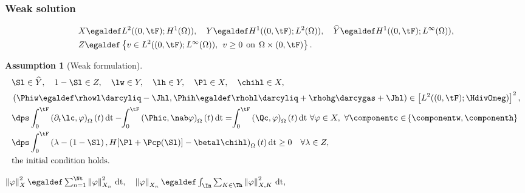 \documentclass[10 pt]{beamer}
\newtheorem{assumption}[theorem]{Assumption}
\begin{document}
\begin{frame}
\frametitle{Weak solution}
\vspace{-0.7 cm}
\begin{equation*}
\begin{split}
&X \egaldef L^2((0,\tF);H^1(\Omega)), \quad Y \egaldef H^1((0,\tF);L^2(\Omega)), \quad \widehat{Y} \egaldef H^1((0,\tF);L^{\infty}(\Omega)),\\
&  Z \egaldef \left\{v \in L^2((0,\tF);L^{\infty}(\Omega)), \hspace{0.15 cm} v \geq 0 \hspace{0.15 cm} \mbox{on} \hspace{0.15 cm} \Omega \times (0,\tF)  \right\}.
\end{split}
\end{equation*}
\pause
\vspace{-0.3 cm}
\begin{assumption}[Weak formulation]
\label{ref:assumption:weak:solution}
\vspace{-0.8 cm}\begin{align*}
&\Sl \in \widehat{Y}, \quad 1-\Sl \in Z, \quad \lw \in Y, \quad \lh \in Y, \quad \Pl \in X, \quad \chihl \in X,\\
&\left(\Phiw \egaldef \rhowl \darcyliq - \Jhl, \Phih \egaldef \rhohl \darcyliq + \rhohg \darcygas + \Jhl\right) \in \left[L^2((0,\tF); \HdivOmeg)\right]^2 ,\\
&\dps \int_{0}^{\tF} \left(\partial_t \lc, \varphi \right)_{\Omega}(t)\,\mathrm{dt}-\hspace{-0.1 cm}\int_{0}^{\tF} \left(\Phic, \nab \varphi \right)_{\Omega}(t)\,\mathrm{dt} = \hspace{-0.1 cm} \int_{0}^{\tF} \left(\Qc, \varphi \right)_{\Omega}(t)\,\mathrm{dt} \ \forall \varphi \in X, \  \forall \componentc \in \hspace{-0.05 cm}\left\{\componentw,\componenth\right\}\\
&\dps \int_{0}^{\tF} \left(\lambda - \left(1 - \Sl\right), H[\Pl+\Pcp(\Sl)]-\betal \chihl  \right)_{\Omega}(t)\,\mathrm{dt} \geq 0 \quad \forall \lambda \in Z, \\
&\nonumber\mbox{the initial condition  holds}.
\end{align*}
\end{assumption}
\pause
$\left\| \varphi \right\|_X^2 \egaldef \sum_{n=1}^{\Nt}\left\| \varphi \right\|_{X_n}^2\,\mathrm{dt}, \quad \left\| \varphi \right\|_{X_n} \egaldef  \int_{\In} \sum_{K \in \Th} \left\| \varphi \right\|_{X,K}^2 \, \mathrm{dt},$


\end{frame}
\end{document}
